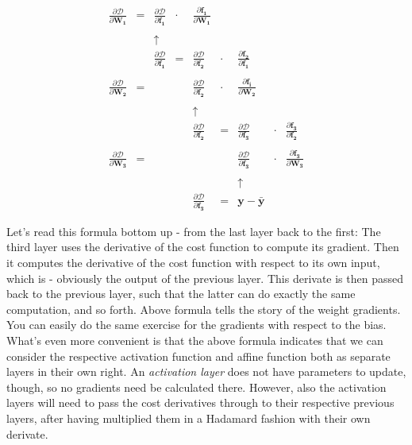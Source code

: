 \documentclass[]{report}
\begin{document}
\bigskip

\begin{equation}\label{key}
\begin{array}{cccccccccccccc}
	 \frac{\partial \mathcal{D}}{\partial{\mathbf{W_1} }} & = & 
	 \frac{\partial \mathcal{D}}{\partial \mathbf{f_1}}  & \cdot & 
	 \frac{\partial{\mathbf{f_1} }}{\partial{\mathbf{W_1} }}  
\\ 
\\
	 & & \uparrow
\\
	& &
	\frac{\partial \mathcal{D}}{\partial \mathbf{f_1}} & = & 
	\frac{\partial \mathcal{D}}{\partial \mathbf{f_2}} & \cdot &
	\frac{\partial{\mathbf{f_2} }}{\partial{\mathbf{f_1} }} 
\\ 
\\
	\frac{\partial \mathcal{D}}{\partial{\mathbf{W_2} }}  & = & &  & 
	\frac{\partial \mathcal{D}}{\partial \mathbf{f_2}} & \cdot &
	\frac{\partial{\mathbf{f_i} }}{\partial{\mathbf{W_2} }} 
\\
\\
 & & & & \uparrow
\\
   &  & &  & 
	\frac{\partial \mathcal{D}}{\partial \mathbf{f_2}} & = &
	\frac{\partial \mathcal{D}}{\partial \mathbf{f_3}} & \cdot &
	\frac{\partial{\mathbf{f_3} }}{\partial{\mathbf{f_2} }} 
\\ 
\\
\frac{\partial \mathcal{D}}{\partial{\mathbf{W_3} }}  & = & &  & &  & 
\frac{\partial \mathcal{D}}{\partial \mathbf{f_3}} & \cdot &
\frac{\partial{\mathbf{f_3} }}{\partial{\mathbf{W_3} }} 
\\
\\
& & & & & & \uparrow
\\
& & & &\frac{\partial \mathcal{D}}{\partial \mathbf{f_3}}  & = & \mathbf{y} - \mathbf{\bar{y}} 
\end{array}
\end{equation}

Let's read this formula bottom up - from the last layer back to the first: The third layer uses the derivative of the cost function to compute its gradient. Then it computes the derivative of the cost function with respect to its own input, which is - obviously the output of the previous layer. This derivate is then passed back to the previous layer, such that the latter can do exactly the same computation, and so forth. Above formula tells the story of the weight gradients. You can easily do the same exercise for the gradients with respect to the bias. What's even more convenient is that the above formula indicates that we can consider the respective activation function and affine function both as separate layers in their own right. An \emph{activation layer} does not have parameters to update, though,  so no gradients need be calculated there. However, also the activation layers will need to pass the cost derivatives through to their respective previous layers, after having multiplied them in a Hadamard fashion with their own derivate. 
\end{document}
